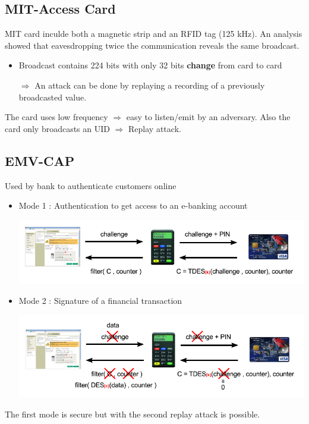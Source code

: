 

\subsection{MIT-Access Card}

MIT card inculde both a magnetic strip and an RFID tag (125 kHz).
An analysis showed that eavesdropping twice the communication 
reveals the same broadcast.
\begin{itemize}
    \item Broadcast contains 224 bits with only 32 bits \textbf{change}
            from card to card
    \item[$\Rightarrow$]An attack can be done by replaying a recording
        of a previously broadcasted value.
\end{itemize}

The card uses low frequency $\Rightarrow$ easy to listen/emit by an adversary. Also the card only broadcasts an UID $\Rightarrow$ Replay attack.

\subsection{EMV-CAP}

Used by bank to authenticate customers online 
\begin{itemize}
	\item Mode 1 : Authentication to get access to an e-banking account 
	\begin{center}
		\includegraphics[scale=0.6]{img/mode1-ebanking}
	\end{center}
	
	\item Mode 2 : Signature of a financial transaction
	\begin{center}
		\includegraphics[scale=0.6]{img/mode2-ebanking}
	\end{center}
\end{itemize}
The first mode is secure but with the second replay attack is possible. %


